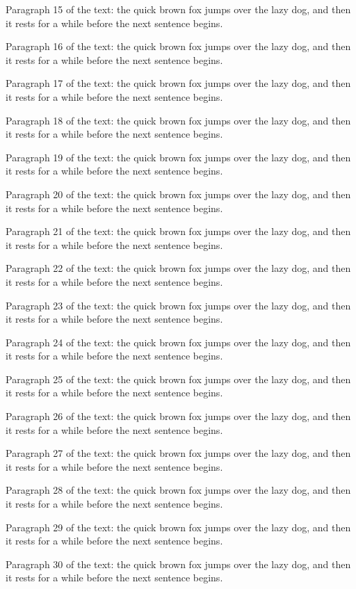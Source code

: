 \documentclass{article}
\begin{document}
Paragraph 15 of the text: the quick brown fox jumps over the lazy dog, and then it rests for a while before the next sentence begins.

Paragraph 16 of the text: the quick brown fox jumps over the lazy dog, and then it rests for a while before the next sentence begins.

Paragraph 17 of the text: the quick brown fox jumps over the lazy dog, and then it rests for a while before the next sentence begins.

Paragraph 18 of the text: the quick brown fox jumps over the lazy dog, and then it rests for a while before the next sentence begins.

Paragraph 19 of the text: the quick brown fox jumps over the lazy dog, and then it rests for a while before the next sentence begins.

Paragraph 20 of the text: the quick brown fox jumps over the lazy dog, and then it rests for a while before the next sentence begins.

Paragraph 21 of the text: the quick brown fox jumps over the lazy dog, and then it rests for a while before the next sentence begins.

Paragraph 22 of the text: the quick brown fox jumps over the lazy dog, and then it rests for a while before the next sentence begins.

Paragraph 23 of the text: the quick brown fox jumps over the lazy dog, and then it rests for a while before the next sentence begins.

Paragraph 24 of the text: the quick brown fox jumps over the lazy dog, and then it rests for a while before the next sentence begins.

Paragraph 25 of the text: the quick brown fox jumps over the lazy dog, and then it rests for a while before the next sentence begins.

Paragraph 26 of the text: the quick brown fox jumps over the lazy dog, and then it rests for a while before the next sentence begins.

Paragraph 27 of the text: the quick brown fox jumps over the lazy dog, and then it rests for a while before the next sentence begins.

Paragraph 28 of the text: the quick brown fox jumps over the lazy dog, and then it rests for a while before the next sentence begins.

Paragraph 29 of the text: the quick brown fox jumps over the lazy dog, and then it rests for a while before the next sentence begins.

Paragraph 30 of the text: the quick brown fox jumps over the lazy dog, and then it rests for a while before the next sentence begins.

\printindex
\end{document}

